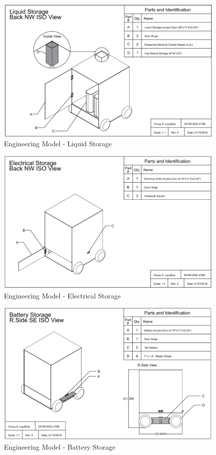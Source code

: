 \documentclass [10pt]{article}
\begin{document}
\begin{figure}
	\centering
	\includegraphics [scale = 0.55] {figures/CAD_Liquid_Storage.png}
	\caption{Engineering Model - Liquid Storage}
\end{figure}
	
\begin{figure}
	\centering
	\includegraphics [scale = 0.55] {figures/CAD_Electrical_Storage.png}
	\caption{Engineering Model - Electrical Storage}
\end{figure}
	
\begin{figure}
	\centering
	\includegraphics [scale = 0.55] {figures/CAD_Battery_Storage.png}
	\caption{Engineering Model - Battery Storage}
\end{figure}
	
\end{document}
